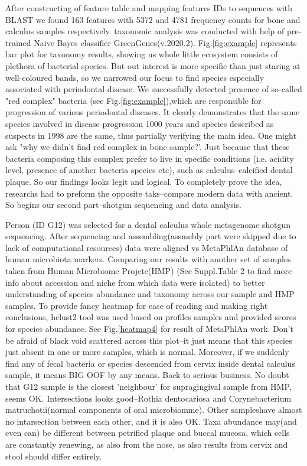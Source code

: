 \documentclass{article}
\begin{document}
  
 After constructing of feature table and mapping features IDs to sequences with BLAST we found 163 features with 5372 and 4781 frequency counts for bone and calculus samples respectively. taxonomic analysis was conducted with help of pre-trained Naive Bayes classifier GreenGenes(v.2020.2). Fig.\ref{fig:example} represents bar plot for taxonomy results, showing us whole little ecosystem consists of plethora of bacterial species. But out interest is more specific than just staring at well-coloured bands, so we narrowed our focus to find species especially associated with periodontal disease. We successfully detected presence of so-called "red complex" bacteria (see Fig.\ref{fig:example}),which are responsible for progression of various periodontal diseases. It clearly demonstrates that the same species involved in disease progression 1000 years and species described as suspects in 1998 are the same, thus partially verifying the main idea. One might ask "why we didn't find red complex in bone sample?'. Just because that these bacteria composing this complex prefer to live in specific conditions (i.e. acidity level, presence of another bacteria species etc), such as calculus--calcified dental plaque. So our findings looks legit and logical. To completely prove the idea, researchs had to preform the opposite taks--compare modern data with ancient. So begins our second part--shotgun sequencing and data analysis.

 

Person (ID G12) was selected for a dental calculus whole metagenome shotgun sequencing. After sequencing and assembling(assmebly part were skipped due to lack of computational resources) data were aligned vs MetaPhlAn database of human microbiota markers. Comparing our results with another set of samples taken from Human Microbiome Projetc(HMP) (See Suppl.Table 2 to find more info about accession and niche from which data were isolated) to better understanding of species abundance and taxonomy across our sample and HMP samples. To provide fancy heatmap for ease of reading and making right conclusions, hclust2 tool was used based on profiles samples and provided scores for species abundance. See Fig.\ref{heatmap4} for result of MetaPhlAn work.  Don't be afraid of black void scattered across this plot--it just means that this species just absent in one or more samples, which is normal. Moreover, if we suddenly find any of fecal bacteria or species descended from cervix inside dental calculus sample, it means BIG OOF by any means. Back to serious business. No doubt that G12 sample is the closest 'neighbour' for supragingival sample from HMP, seems OK. Intersections looks good--Rothia dentocariosa and Corynebacterium matruchotii(normal components of oral microbiomme). Other sampleshave almost no intarsection between each other, and it is also OK. Taxa abundance may(and even can) be different between petrified plaque and buccal mucosa, which cells are constantly renewing, as also from the nose, as also results from cervix and stool should differ entirely.
\end{document}
